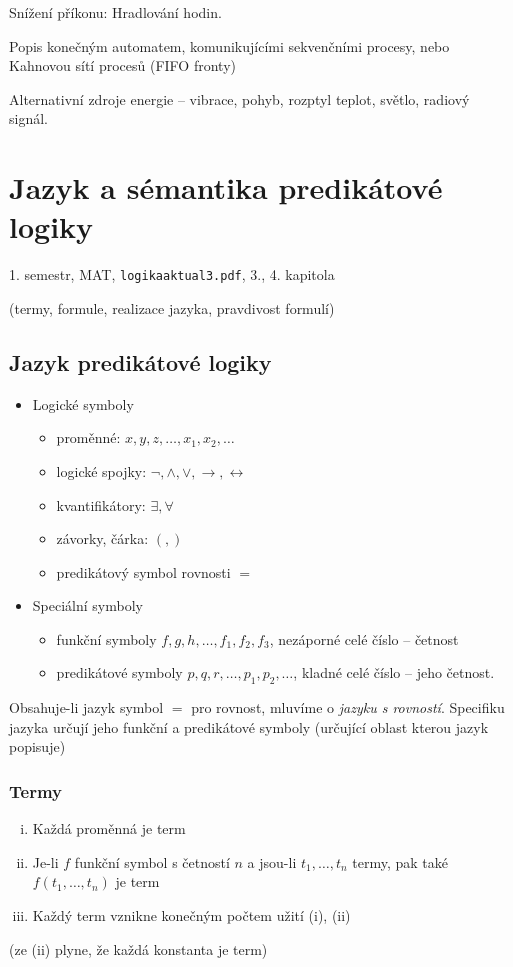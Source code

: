\documentclass[a4paper, 11pt]{report}
\begin{document}
Snížení příkonu: Hradlování hodin.

Popis konečným automatem, komunikujícími sekvenčními procesy, nebo Kahnovou sítí procesů (FIFO fronty)

Alternativní zdroje energie -- vibrace, pohyb, rozptyl teplot, světlo, radiový signál.

\chapter{Jazyk a sémantika predikátové logiky} \label{cha:6}
1. semestr, MAT, \texttt{logikaaktual3.pdf}, 3., 4. kapitola

(termy, formule, realizace jazyka, pravdivost formulí)

\section{Jazyk predikátové logiky}

\begin{itemize}
	\item Logické symboly
	\begin{itemize}
		\item proměnné: $x, y, z, \dots, x_1, x_2, \dots$
		\item logické spojky: $ \lnot, \land, \lor, \to, \leftrightarrow$
		\item kvantifikátory: $\exists, \forall$
		\item závorky, čárka: $(,)$
		\item predikátový symbol rovnosti $=$
	\end{itemize}
	\item Speciální symboly
	\begin{itemize}
		\item funkční symboly $f, g, h, \dots, f_1, f_2, f_3$, nezáporné celé číslo -- četnost
		\item predikátové symboly $p, q, r, \dots, p_1, p_2, \dots$, kladné celé číslo -- jeho četnost.
	\end{itemize}
\end{itemize}

Obsahuje-li jazyk symbol $=$ pro rovnost, mluvíme o \emph{jazyku s rovností}.
Specifiku jazyka určují jeho funkční a predikátové symboly (určující oblast kterou jazyk popisuje)

\subsection{Termy}
\begin{enumerate}[(i)]
	\item Každá proměnná je term
	\item Je-li $f$ funkční symbol s četností $n$ a jsou-li $t_1, \dots, t_n$ termy, pak také $f(t_1, \dots, t_n)$ je term
	\item Každý term vznikne konečným počtem užití (i), (ii)
\end{enumerate}
(ze (ii) plyne, že každá konstanta je term)
\end{document}
